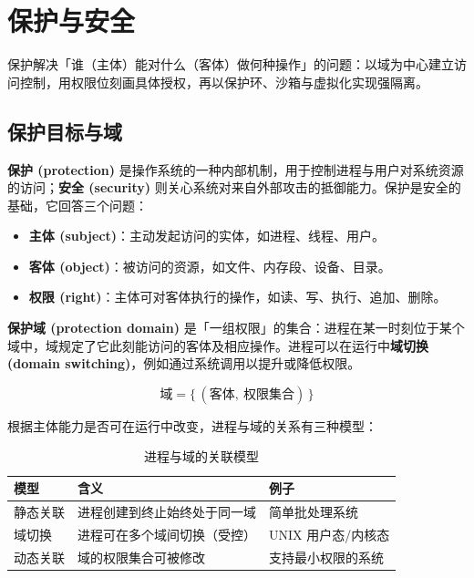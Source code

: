 \clearpage
\begingroup
\let\clearpage\relax
\let\cleardoublepage\relax
\vspace*{\fill}
\chapter{保护与安全}
\begin{center}
保护解决「谁（主体）能对什么（客体）做何种操作」的问题：以域为中心建立访问控制，用权限位刻画具体授权，再以保护环、沙箱与虚拟化实现强隔离。
\end{center}
\vspace*{\fill}
\endgroup
\clearpage

\section{保护目标与域}

\textbf{保护 (protection)} 是操作系统的一种内部机制，用于控制进程与用户对系统资源的访问；\textbf{安全 (security)} 则关心系统对来自外部攻击的抵御能力。保护是安全的基础，它回答三个问题：

\begin{itemize}
    \item \textbf{主体 (subject)}：主动发起访问的实体，如进程、线程、用户。
    \item \textbf{客体 (object)}：被访问的资源，如文件、内存段、设备、目录。
    \item \textbf{权限 (right)}：主体可对客体执行的操作，如读、写、执行、追加、删除。
\end{itemize}

\textbf{保护域 (protection domain)} 是「一组权限」的集合：进程在某一时刻位于某个域中，域规定了它此刻能访问的客体及相应操作。进程可以在运行中\textbf{域切换 (domain switching)}，例如通过系统调用以提升或降低权限。

\begin{equation}
    \text{域} = \{\,(\text{客体},\ \text{权限集合})\,\}
\end{equation}

\noindent 根据主体能力是否可在运行中改变，进程与域的关系有三种模型：

\begin{table}[H]
\centering
\caption{进程与域的关联模型}
\begin{tabulary}{\textwidth}{LLL}
\toprule
模型 & 含义 & 例子 \\
\midrule
静态关联 & 进程创建到终止始终处于同一域 & 简单批处理系统 \\
域切换 & 进程可在多个域间切换（受控） & UNIX 用户态/内核态 \\
动态关联 & 域的权限集合可被修改 & 支持最小权限的系统 \\
\bottomrule
\end{tabulary}
\end{table}


